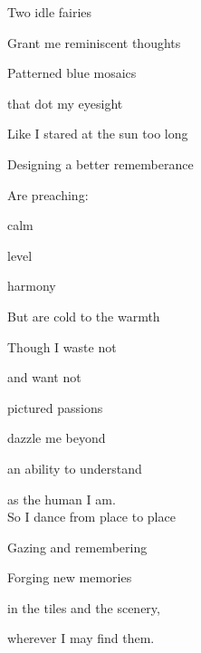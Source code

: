 Two idle fairies

Grant me reminiscent thoughts

Patterned blue mosaics

that dot my eyesight

Like I stared at the sun too long

Designing a better rememberance

Are preaching:

\quad \quad calm

\quad \quad level

\quad \quad harmony

But are cold to the warmth

Though I waste not

\quad and want not

pictured passions

dazzle me beyond

an ability to understand

as the human I am.\\

So I dance from place to place

Gazing and remembering

Forging new memories

in the tiles and the scenery,

wherever I may find them.

